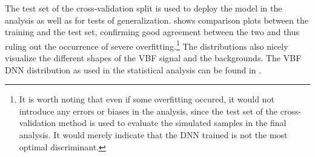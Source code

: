 
The test set of the cross-validation split is used to deploy the model in the analysis as well as for tests of generalization.
 shows comparison plots between the training and the test set, confirming good agreement between the two and thus ruling out the occurrence of severe overfitting.\footnote{It is worth noting that even if some overfitting occured, it would not introduce any errors or biases in the analysis, since the test set of the cross-validation method is used to evaluate the simulated samples in the final analysis. It would merely indicate that the DNN trained is not the most optimal discriminant.}
The distributions also nicely visualize the different shapes of the VBF signal and the backgrounds.
The VBF DNN distribution as used in the statistical analysis can be found in .


